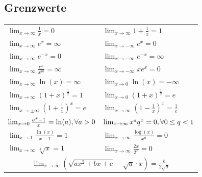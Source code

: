 \documentclass[a4paper,10pt]{article}
\def\limxo{\lim_{x\to 0}}
\def\limxi{\lim_{x\to\infty}}
\def\limxn{\lim_{x\to-\infty}}
\begin{document}
    \subsection{Grenzwerte}
    \begin{center}
        \begin{tabularx}{\linewidth}{XX}
            \toprule
            $\limxi \frac{1}{x} = 0$                                   & $\limxi 1 + \frac{1}{x} = 1$             \\
            $\limxi e^x = \infty$                                      & $\limxn e^x = 0$                         \\
            $\limxi e^{-x} = 0$                                        & $\limxn e^{-x} = \infty$                 \\
            $\limxi \frac{e^x}{x^m} = \infty$                          & $\limxn xe^x = 0$                        \\
            $\limxi \ln(x) = \infty$                                   & $\limxo \ln(x) = -\infty$                \\
            $\limxi (1+x)^{\frac{1}{x}} = 1$                           & $\limxo (1+x)^{\frac{1}{x}} = e$         \\
            $\lim_{x\to\pm\infty} (1 + \frac{1}{x})^x = e$             & $\limxi (1-\frac{1}{x})^x = \frac{1}{e}$ \\
            $\limxo \frac{a^x -1}{x} = \ln(a), \newline \forall a > 0$ &                                          
            $\limxi x^a q^x = 0, \newline \forall 0 \le q < 1$ \\
            $\lim_{x\to 1} \frac{\ln(x)}{x-1} = 1$        & $\limxi \frac{\log(x)}{x^a} = 0$   \\
            $\limxi \sqrt[x]{x} = 1$                      & $\limxi \frac{2x}{2^x} = 0$        \\
            \multicolumn{2}{c}{$\lim_{x\to \infty} \left(\sqrt{ax^2+bx+c}-\sqrt{a}\cdot x \right) = \frac{b}{2\sqrt{a}}$} \\
            \bottomrule
        \end{tabularx}
    \end{center}
    
    
\end{document}
